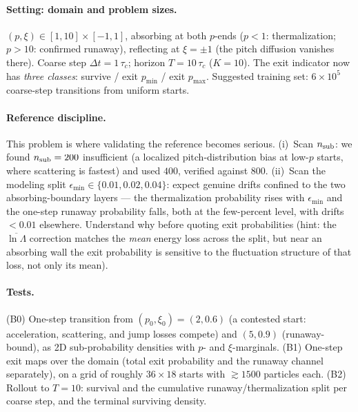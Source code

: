 \documentclass[11pt]{article}
\begin{document}
\paragraph{Setting: domain and problem sizes.} $(p,\xi)\in[1,10]\times[-1,1]$,
absorbing at both $p$-ends ($p<1$: thermalization; $p>10$: confirmed
runaway), reflecting at $\xi=\pm1$ (the pitch diffusion vanishes there).
Coarse step $\Delta t=1\,\tau_c$; horizon $T=10\,\tau_c$ ($K=10$). The
exit indicator now has \emph{three classes}: survive / exit $p_{\min}$ /
exit $p_{\max}$. Suggested training set: $6\times10^5$ coarse-step
transitions from uniform starts.

\paragraph{Reference discipline.} This problem is where validating the
reference becomes serious. (i)~Scan $n_{\rm sub}$: we found
$n_{\rm sub}=200$ insufficient (a localized pitch-distribution bias at
low-$p$ starts, where scattering is fastest) and used $400$, verified
against $800$. (ii)~Scan the modeling split
$\epsilon_{\min}\in\{0.01,0.02,0.04\}$: expect genuine drifts confined to
the two absorbing-boundary layers --- the thermalization probability
rises with $\epsilon_{\min}$ and the one-step runaway probability falls,
both at the few-percent level, with drifts $<0.01$ elsewhere. Understand
why before quoting exit probabilities (hint: the
$\overline{\ln\Lambda}$ correction matches the \emph{mean} energy loss
across the split, but near an absorbing wall the exit probability is
sensitive to the fluctuation structure of that loss, not only its mean).

\paragraph{Tests.} (B0) One-step transition from $(p_0,\xi_0)=(2,0.6)$
(a contested start: acceleration, scattering, and jump losses compete)
and $(5,0.9)$ (runaway-bound), as 2D sub-probability densities with $p$-
and $\xi$-marginals. (B1) One-step exit maps over the domain (total exit
probability and the runaway channel separately), on a grid of roughly
$36\times18$ starts with $\gtrsim1500$ particles each. (B2) Rollout to
$T=10$: survival and the cumulative runaway/thermalization split per
coarse step, and the terminal surviving density.
\end{document}
